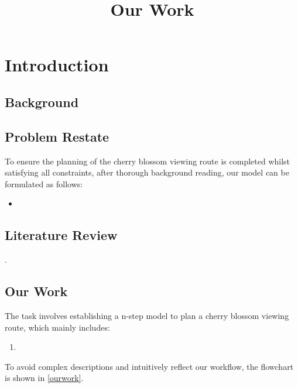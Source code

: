 \documentclass{mcmthesis} %
\title{Our Work}
\begin{document}
\graphicspath{{.}}  %
\begin{abstract}

\end{abstract}

\begin{keywords}

\end{keywords}

\makesheet
\clearpage

\begin{center}	
\tableofcontents
\end{center}     

\newpage
\pagestyle{fancy}
\setcounter{page}{1}
\section{Introduction}

\subsection{Background}

\subsection{Problem Restate}

To ensure the planning of the cherry blossom viewing route is 
completed whilst satisfying all constraints, after thorough 
background reading, our model can be formulated as follows:\\
\begin{itemize}
    \item 
\end{itemize}

\subsection{Literature Review}
\cite{zou2008application}.
\subsection{Our Work}

The task involves establishing a n-step model to plan a cherry blossom viewing route, which 
mainly includes:\\
\begin{enumerate}
	\item
\end{enumerate}
To avoid complex descriptions and intuitively reflect our workflow, the flowchart is shown in \autoref{ourwork}.
\end{document}
